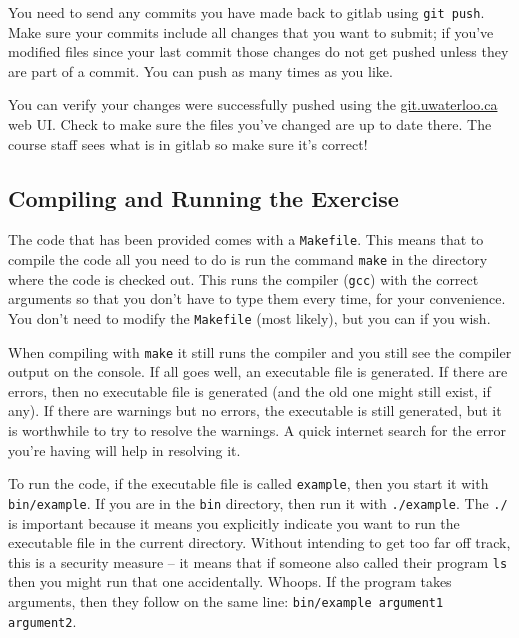 You need to send any commits you have made back to gitlab using \texttt{git push}. Make sure your commits include all changes that you want to submit; if you've modified files since your last commit those changes do not get pushed unless they are part of a commit. You can push as many times as you like.

You can verify your changes were successfully pushed using the \url{git.uwaterloo.ca} web UI. Check to make sure the files you've changed are up to date there. The course staff sees what is in gitlab so make sure it's correct!

\subsection*{Compiling and Running the Exercise}

The code that has been provided comes with a \texttt{Makefile}. This means that to compile the code all you need to do is run the command \texttt{make} in the directory where the code is checked out. This runs the compiler (\texttt{gcc}) with the correct arguments so that you don't have to type them every time, for your convenience. You don't need to modify the \texttt{Makefile} (most likely), but you can if you wish.

When compiling with \texttt{make} it still runs the compiler and you still see the compiler output on the console. If all goes well, an executable file is generated. If there are errors, then no executable file is generated (and the old one might still exist, if any). If there are warnings but no errors, the executable is still generated, but it is worthwhile to try to resolve the warnings. A quick internet search for the error you're having will help in resolving it.

To run the code, if the executable file is called \texttt{example}, then you start it with \texttt{bin/example}. If you are in the \texttt{bin} directory, then run it with \texttt{./example}. The \texttt{./} is important because it means you explicitly indicate you want to run the executable file in the current directory. Without intending to get too far off track, this is a security measure -- it means that if someone also called their program  \texttt{ls} then you might run that one accidentally. Whoops. If the program takes arguments, then they follow on the same line: \texttt{bin/example argument1 argument2}.




